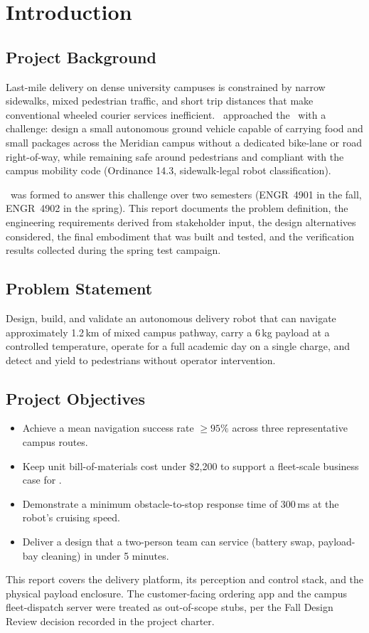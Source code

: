 \section{Introduction}
\label{sec:intro}

\subsection{Project Background}
Last-mile delivery on dense university campuses is constrained by narrow sidewalks,
mixed pedestrian traffic, and short trip distances that make conventional wheeled
courier services inefficient. \ProjectSponsor\ approached the \ProjectDept\ with a
challenge: design a small autonomous ground vehicle capable of carrying food and
small packages across the Meridian campus without a dedicated bike-lane or road
right-of-way, while remaining safe around pedestrians and compliant with the campus
mobility code (Ordinance 14.3, sidewalk-legal robot classification).

\ProjectTeamName\ was formed to answer this challenge over two semesters
(ENGR~4901 in the fall, ENGR~4902 in the spring). This report documents the
problem definition, the engineering requirements derived from stakeholder input,
the design alternatives considered, the final embodiment that was built and
tested, and the verification results collected during the spring test campaign.

\subsection{Problem Statement}
Design, build, and validate an autonomous delivery robot that can navigate
approximately 1.2\,km of mixed campus pathway, carry a 6\,kg payload at a
controlled temperature, operate for a full academic day on a single charge,
and detect and yield to pedestrians without operator intervention.

\subsection{Project Objectives}
\begin{itemize}[leftmargin=1.4em]
  \item Achieve a mean navigation success rate $\geq 95\%$ across three
        representative campus routes.
  \item Keep unit bill-of-materials cost under \$2{,}200 to support a
        fleet-scale business case for \ProjectSponsor.
  \item Demonstrate a minimum obstacle-to-stop response time of 300\,ms
        at the robot's cruising speed.
  \item Deliver a design that a two-person team can service (battery swap,
        payload-bay cleaning) in under 5 minutes.
\end{itemize}

\begin{infobox}
This report covers the delivery platform, its perception and control stack, and
the physical payload enclosure. The customer-facing ordering app and the campus
fleet-dispatch server were treated as out-of-scope stubs, per the Fall Design
Review decision recorded in the project charter.
\end{infobox}
